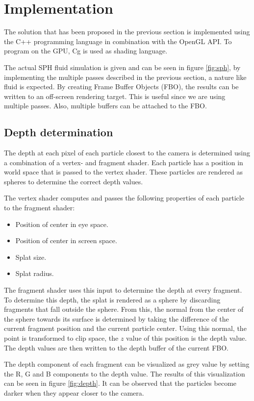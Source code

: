 \section{Implementation}
The solution that has been proposed in the previous section is implemented using the C++ programming language in combination with the OpenGL API.
To program on the GPU, Cg is used as shading language.

The actual SPH fluid simulation is given and can be seen in figure \ref{fig:sph}, by implementing the multiple passes described in the previous section, a nature like fluid is expected.
By creating Frame Buffer Objects (FBO), the results can be written to an off-screen rendering target.
This is useful since we are using multiple passes.
Also, multiple buffers can be attached to the FBO.

\subsection{Depth determination}
The depth at each pixel of each particle closest to the camera is determined using a combination of a vertex- and fragment shader.
Each particle has a position in world space that is passed to the vertex shader.
These particles are rendered as spheres to determine the correct depth values.

The vertex shader computes and passes the following properties of each particle to the fragment shader:
\begin{itemize}
 	\item Position of center in eye space.
 	\item Position of center in screen space.
 	\item Splat size.
 	\item Splat radius.
 \end{itemize} 

The fragment shader uses this input to determine the depth at every fragment.
To determine this depth, the splat is rendered as a sphere by discarding fragments that fall outside the sphere.
From this, the normal from the center of the sphere towards its surface is determined by taking the difference of the current fragment position and the current particle center.
Using this normal, the point is transformed to clip space, the $z$ value of this position is the depth value.
The depth values are then written to the depth buffer of the current FBO.

The depth component of each fragment can be visualized as grey value by setting the R, G and B components to the depth value.
The results of this visualization can be seen in figure \ref{fig:depth}.
It can be observed that the particles become darker when they appear  closer to the camera.

